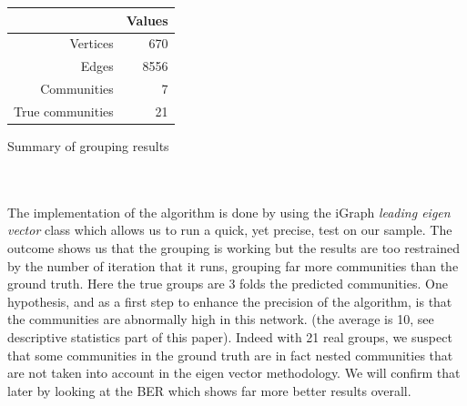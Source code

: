 \documentclass[11pt]{article}       %
\begin{document}
\begin{center}
\begin{tabular}[b]{rr}
  \hline
 & Values \\ 
  \hline
  Vertices & 670 \\ 
   Edges & 8556 \\
  Communities & 7 \\ 
  True communities & 21 \\ 
   \hline
\end{tabular}
\vspace{0cm}
\caption{Summary of grouping results}
\end{center}
\\
\\
The implementation of the algorithm is done by using the iGraph \textit{leading eigen vector} class which allows us to run a quick, yet precise, test on our sample. The outcome shows us that the grouping is working but the results are too restrained by the number of iteration that it runs, grouping far more communities than the ground truth. Here the true groups are 3 folds the predicted communities. One hypothesis, and as a first step to enhance the precision of the algorithm, is that the communities are abnormally high in this network. (the average is 10, see descriptive statistics part of this paper). Indeed with 21 real groups, we suspect that some communities in the ground truth are in fact nested communities that are not taken into account in the eigen vector methodology. We will confirm that later by looking at the BER which shows far more better results overall. 
\end{document}
